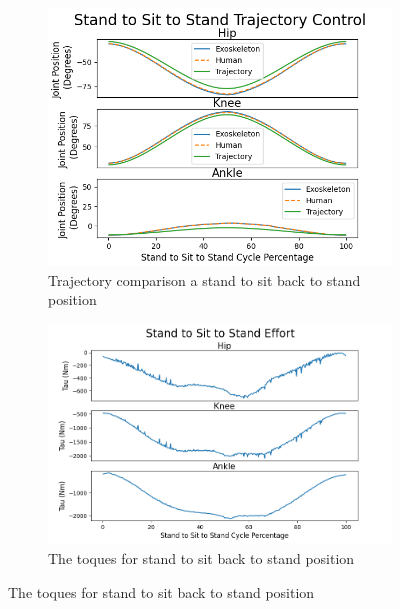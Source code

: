  
 
  \begin{figure}[h!]
    \begin{subfigure}{0.5\textwidth}
        \centering
        \includegraphics[width=\textwidth]{images/sim/standsitstandjoints (1).png}
        \caption{Trajectory comparison a stand to sit back to stand position}
        \label{fig:simsit2standTraj}
    \end{subfigure}
    \begin{subfigure}{0.5\textwidth}
        \centering
        \includegraphics[width=\textwidth]{images/sim/standsitstandtau.png}
        \caption{The toques for stand to sit back to stand position }
    \label{fig:simsit2standtorque}

\end{subfigure}
\end{figure}
